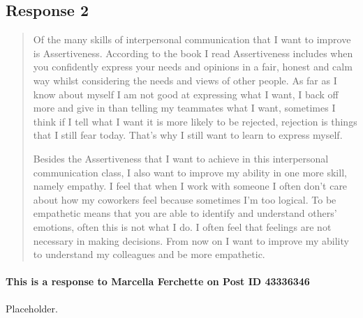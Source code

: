 
\subsection{Response 2}
  \begin{quotation}
    Of the many skills of interpersonal communication that I want to improve is
      Assertiveness. According to the book I read Assertiveness includes when
      you confidently express your needs and opinions in a fair, honest and
      calm way whilst considering the needs and views of other people. As far
      as I know about myself I am not good at expressing what I want, I back
      off more and give in than telling my teammates what I want, sometimes I
      think if I tell what I want it is more likely to be rejected, rejection
      is things that I still fear today. That's why I still want to learn to
      express myself.

    Besides the Assertiveness that I want to achieve in this interpersonal
      communication class, I also want to improve my ability in one more skill,
      namely empathy. I feel that when I work with someone I often don't care
      about how my coworkers feel because sometimes I'm too logical. To be
      empathetic means that you are able to identify and understand others'
      emotions, often this is not what I do. I often feel that feelings are not
      necessary in making decisions. From now on I want to improve my ability to
      understand my colleagues and be more empathetic.
  \end{quotation}

  \paragraph{This is a response to Marcella Ferchette on Post ID 43336346}
    Placeholder.
